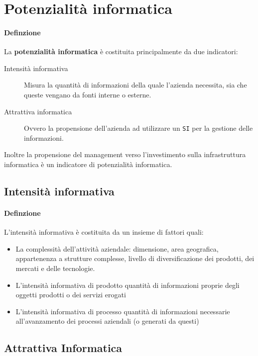 \section{Potenzialità informatica}
    \paragraph{Definzione} La \textbf{potenzialità informatica} è costituita principalmente da due indicatori:
    \begin{description}
        \item[Intensità informativa] Misura la quantità di informazioni della quale l'azienda necessita, sia che queste vengano da fonti interne o esterne.
        \item[Attrattiva informatica] Ovvero la propensione dell'azienda ad utilizzare un \texttt{SI} per la gestione delle informazioni.
    \end{description}
    Inoltre la propensione del management verso l'investimento sulla infrastruttura informatica è un indicatore di potenzialità informatica. 
    \subsection{Intensità informativa}
        \paragraph{Definzione} L'intensità informativa è costituita da un insieme di fattori quali:
        \begin{itemize}
            \item La complessità dell'attività aziendale: dimensione, area geografica, appartenenza a strutture complesse, livello di diversificazione dei prodotti, dei mercati e delle tecnologie.
            \item L'intensità informativa di prodotto
                \subitem quantità di informazioni proprie degli oggetti prodotti o dei servizi erogati
            \item L'intensità informativa di processo
                \subitem quantità di informazioni necessarie all'avanzamento dei processi aziendali (o generati da questi)
        \end{itemize}
    \subsection{Attrattiva Informatica}
